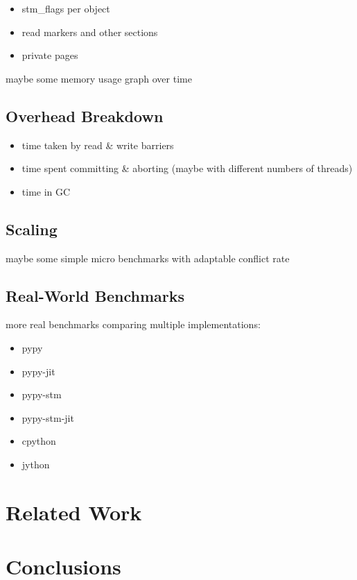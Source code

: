 \documentclass{sigplanconf}
\begin{document}
\begin{itemize}
\item stm\_flags per object
\item read markers and other sections
\item private pages
\end{itemize}

maybe some memory usage graph over time


\subsection{Overhead Breakdown}

\begin{itemize}
\item time taken by read \& write barriers
\item time spent committing \& aborting (maybe with different numbers
  of threads)
\item time in GC
\end{itemize}


\subsection{Scaling}

maybe some simple micro benchmarks with adaptable conflict rate


\subsection{Real-World Benchmarks}

more real benchmarks comparing multiple implementations:
\begin{itemize}[noitemsep]
\item pypy
\item pypy-jit
\item pypy-stm
\item pypy-stm-jit
\item cpython
\item jython
\end{itemize}


\section{Related Work}


\section{Conclusions}
\end{document}
